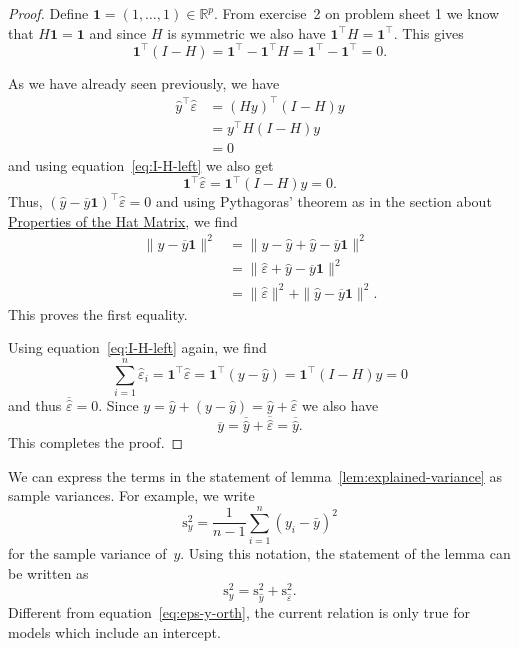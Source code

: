 \documentclass[
  a4paper,
]{article}
\theoremstyle{definition}
\theoremstyle{definition}
\theoremstyle{definition}
\theoremstyle{definition}
\theoremstyle{remark}
\begin{document}
\begin{proof}
Define \(\mathbf{1} = (1, \ldots, 1) \in \mathbb{R}^p\). From exercise~2 on
problem sheet 1 we know that \(H\mathbf{1} = \mathbf{1}\) and since \(H\)
is symmetric we also have \(\mathbf{1}^\top H = \mathbf{1}^\top\).
This gives
\begin{equation}
  \mathbf{1}^\top (I - H)
  = \mathbf{1}^\top - \mathbf{1}^\top H
  = \mathbf{1}^\top - \mathbf{1}^\top
  = 0.  \label{eq:I-H-left}
\end{equation}

As we have already seen previously, we have
\begin{align*}
  \hat y^\top \hat\varepsilon
  &= (H y)^\top (I - H) y \\
  &= y^\top H (I - H) y \\
  &= 0
\end{align*}
and using equation~\eqref{eq:I-H-left} we also get
\begin{equation}
  \mathbf{1}^\top \hat\varepsilon
  = \mathbf{1}^\top (I - H) y
  = 0.
\end{equation}
Thus, \((\hat y - \overline{y} \mathbf{1})^\top \hat\varepsilon= 0\) and using
Pythagoras' theorem as in the section about \hyperref[hat-matrix]{Properties of the Hat Matrix}, we
find
\begin{align*}
  \| y - \overline{y} \mathbf{1} \|^2
  &= \| y - \hat y + \hat y - \overline{y} \mathbf{1} \|^2 \\
  &= \| \hat \varepsilon+ \hat y - \overline{y} \mathbf{1} \|^2 \\
  &= \| \hat \varepsilon\|^2 + \| \hat y - \overline{y} \mathbf{1} \|^2.
\end{align*}
This proves the first equality.

Using equation~\eqref{eq:I-H-left} again, we find
\begin{equation*}
  \sum_{i=1}^n \hat\varepsilon_i
  = \mathbf{1}^\top \hat\varepsilon
  = \mathbf{1}^\top (y - \hat y)
  = \mathbf{1}^\top (I - H) y
  = 0
\end{equation*}
and thus \(\overline{\hat\varepsilon} = 0\).
Since \(y = \hat y + (y - \hat y) = \hat y + \hat\varepsilon\) we also have
\begin{equation*}
  \overline{y}
  = \overline{\hat y} + \overline{\hat\varepsilon}
  = \overline{\hat y}.
\end{equation*}
This completes the proof.
\end{proof}

We can express the terms in the statement of lemma~\ref{lem:explained-variance}
as sample variances. For example, we write
\begin{equation*}
  \mathrm{s}_y^2
  = \frac{1}{n-1} \sum_{i=1}^n (y_i - \bar y)^2
\end{equation*}
for the sample variance of~\(y\). Using this notation, the statement of
the lemma can be written as
\begin{equation*}
  \mathrm{s}_y^2
  = \mathrm{s}_{\hat y}^2 + \mathrm{s}_{\hat\varepsilon}^2.
\end{equation*}
Different from equation~\eqref{eq:eps-y-orth}, the current relation is
only true for models which include an intercept.
\end{document}
